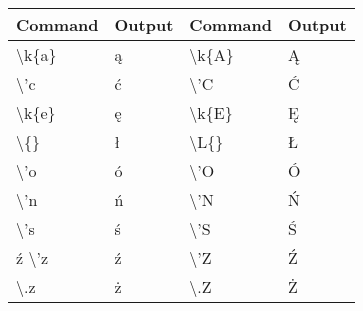\documentclass[a4paper,11pt]{article}
\begin{document}
\begin{table}[h]
\begin{center}
\label{tab:warunkiTerenowe}
\begin{tabular}{|l l|l l|}\hline
Command&Output&Command&Output \\ \hline
\textbackslash k\{a\}&\k{a}&\textbackslash k\{A\}&\k{A} \\ 
\textbackslash 'c&\'c&\textbackslash 'C&\'C \\ 
\textbackslash k\{e\}&\k{e}&\textbackslash k\{E\}&\k{E} \\
\textbackslash \{\}&\l{}&\textbackslash L\{\}&\L{} \\	
\textbackslash 'o&\'o&\textbackslash 'O&\'O \\ 
\textbackslash 'n&\'n&\textbackslash 'N&\'N \\
\textbackslash 's&\'s&\textbackslash 'S&\'S \\\'z
\textbackslash 'z&\'z&\textbackslash 'Z&\'Z \\
\textbackslash .z&\.z&\textbackslash .Z&\.Z \\ \hline

\end{tabular}
\end{center}
\end{table}
\end{document}
